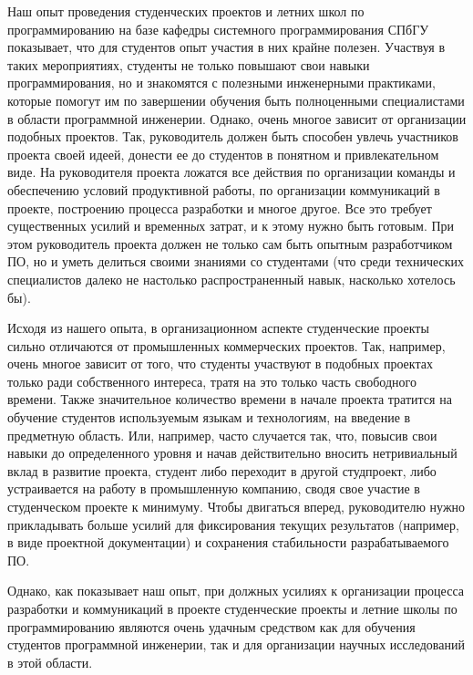 \documentclass[a4paper]{article}
\begin{document}
Наш опыт проведения студенческих проектов и летних школ по программированию на базе кафедры системного программирования СПбГУ показывает, что для студентов опыт участия в них крайне полезен. Участвуя в таких мероприятиях, студенты не только повышают свои навыки программирования, но и знакомятся с полезными инженерными практиками, которые помогут им по завершении обучения быть полноценными специалистами в области программной инженерии. Однако, очень многое зависит от организации подобных проектов. Так, руководитель должен быть способен увлечь участников проекта своей идеей, донести ее до студентов в понятном и привлекательном виде. На руководителя проекта ложатся все действия по организации команды и обеспечению условий продуктивной работы, по организации коммуникаций в проекте, построению процесса разработки и многое другое. Все это требует существенных усилий и временн\textit{ы}х затрат, и к этому нужно быть готовым. При этом руководитель проекта должен не только сам быть опытным разработчиком ПО, но и уметь делиться своими знаниями со студентами (что среди технических специалистов далеко не настолько распространенный навык, насколько хотелось бы). 

Исходя из нашего опыта, в организационном аспекте студенческие проекты сильно отличаются от промышленных коммерческих проектов. Так, например, очень многое зависит от того, что студенты участвуют в подобных проектах только ради собственного интереса, тратя на это только часть свободного времени. Также значительное количество времени в начале проекта тратится на обучение студентов используемым языкам и технологиям, на введение в предметную область. Или, например, часто случается так, что, повысив свои навыки до определенного уровня и начав действительно вносить нетривиальный вклад в развитие проекта, студент либо переходит в другой студпроект, либо устраивается на работу в промышленную компанию, сводя свое участие в студенческом проекте к минимуму. Чтобы двигаться вперед, руководителю нужно прикладывать больше усилий для фиксирования текущих результатов (например, в виде проектной документации) и сохранения стабильности разрабатываемого ПО. 

Однако, как показывает наш опыт, при должных усилиях к организации процесса разработки и коммуникаций в проекте студенческие проекты и летние школы по программированию являются очень удачным средством как для обучения студентов программной инженерии, так и для организации научных исследований в этой области. 
\end{document}
